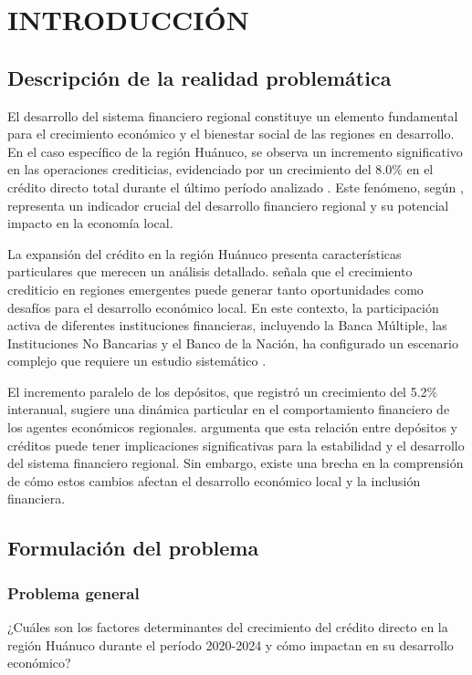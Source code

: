 \documentclass[12pt, a4paper]{article}
\begin{document}
\tableofcontents

\newpage

\section{INTRODUCCIÓN}

\subsection{Descripción de la realidad problemática}

El desarrollo del sistema financiero regional constituye un elemento fundamental para el crecimiento económico y el bienestar social de las regiones en desarrollo. En el caso específico de la región Huánuco, se observa un incremento significativo en las operaciones crediticias, evidenciado por un crecimiento del 8.0\% en el crédito directo total durante el último período analizado \parencite{BCRP2024}. Este fenómeno, según \textcite{Levine2005}, representa un indicador crucial del desarrollo financiero regional y su potencial impacto en la economía local.

La expansión del crédito en la región Huánuco presenta características particulares que merecen un análisis detallado. \textcite{Rodriguez2022} señala que el crecimiento crediticio en regiones emergentes puede generar tanto oportunidades como desafíos para el desarrollo económico local. En este contexto, la participación activa de diferentes instituciones financieras, incluyendo la Banca Múltiple, las Instituciones No Bancarias y el Banco de la Nación, ha configurado un escenario complejo que requiere un estudio sistemático \parencite{Gomez2023}.

El incremento paralelo de los depósitos, que registró un crecimiento del 5.2\% interanual, sugiere una dinámica particular en el comportamiento financiero de los agentes económicos regionales. \textcite{Martinez2021} argumenta que esta relación entre depósitos y créditos puede tener implicaciones significativas para la estabilidad y el desarrollo del sistema financiero regional. Sin embargo, existe una brecha en la comprensión de cómo estos cambios afectan el desarrollo económico local y la inclusión financiera.

\subsection{Formulación del problema}

\subsubsection{Problema general}
¿Cuáles son los factores determinantes del crecimiento del crédito directo en la región Huánuco durante el período 2020-2024 y cómo impactan en su desarrollo económico?
\end{document}
